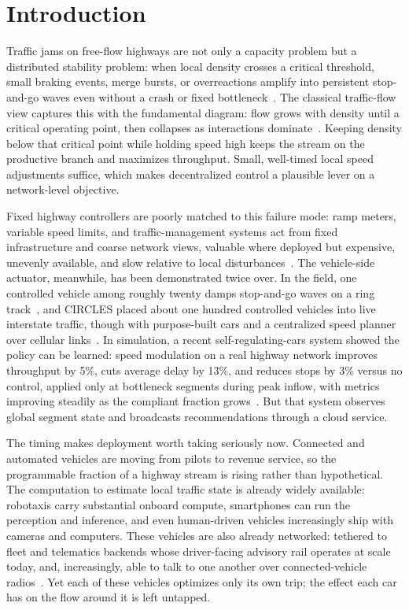 \section{Introduction}
\label{sec:intro}

Traffic jams on free-flow highways are not only a capacity problem but a distributed stability problem: when local density crosses a critical threshold, small braking events, merge bursts, or overreactions amplify into persistent stop-and-go waves even without a crash or fixed bottleneck~\cite{bhardwaj2023understanding,sugiyama2008traffic}. The classical traffic-flow view captures this with the fundamental diagram: flow grows with density until a critical operating point, then collapses as interactions dominate~\cite{greenshields1935study,lighthill1955kinematic,richards1956shock}. Keeping density below that critical point while holding speed high keeps the stream on the productive branch and maximizes throughput. Small, well-timed local speed adjustments suffice, which makes decentralized control a plausible lever on a network-level objective.

Fixed highway controllers are poorly matched to this failure mode: ramp meters, variable speed limits, and traffic-management systems act from fixed infrastructure and coarse network views, valuable where deployed but expensive, unevenly available, and slow relative to local disturbances~\cite{arnold1998ramp,papageorgiou2002freeway}. The vehicle-side actuator, meanwhile, has been demonstrated twice over. In the field, one controlled vehicle among roughly twenty damps stop-and-go waves on a ring track~\cite{stern2018dissipation}, and CIRCLES placed about one hundred controlled vehicles into live interstate traffic, though with purpose-built cars and a centralized speed planner over cellular links~\cite{lee2024traffic}. In simulation, a recent self-regulating-cars system showed the policy can be learned: speed modulation on a real highway network improves throughput by 5\%, cuts average delay by 13\%, and reduces stops by 3\% versus no control, applied only at bottleneck segments during peak inflow, with metrics improving steadily as the compliant fraction grows~\cite{self_regulating_cars}. But that system observes global segment state and broadcasts recommendations through a cloud service.

The timing makes deployment worth taking seriously now. Connected and automated vehicles are moving from pilots to revenue service, so the programmable fraction of a highway stream is rising rather than hypothetical. The computation to estimate local traffic state is already widely available: robotaxis carry substantial onboard compute, smartphones can run the perception and inference, and even human-driven vehicles increasingly ship with cameras and computers. These vehicles are also already networked: tethered to fleet and telematics backends whose driver-facing advisory rail operates at scale today, and, increasingly, able to talk to one another over connected-vehicle radios~\cite{cmt2025,samsara2025}. Yet each of these vehicles optimizes only its own trip; the effect each car has on the flow around it is left untapped.


